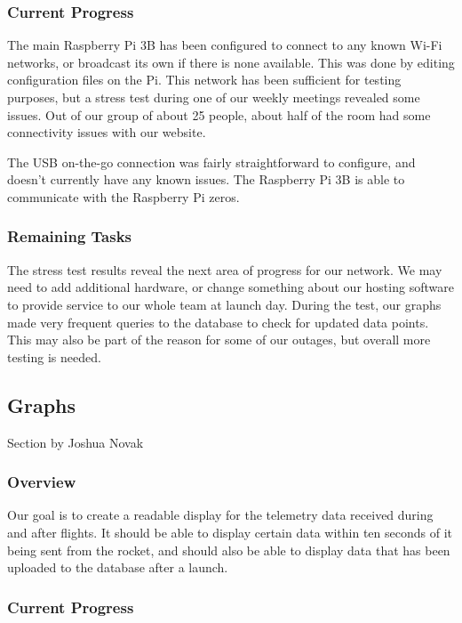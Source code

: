 \documentclass[onecolumn, draftclsnofoot, 10pt, compsoc]{IEEEtran}
\begin{document}
\subsubsection{Current Progress}
The main Raspberry Pi 3B has been configured to connect to any known Wi-Fi networks, or broadcast its own if there is none available. 
This was done by editing configuration files on the Pi. This network has been sufficient for testing purposes, but a stress test during one of our weekly meetings revealed some issues. 
Out of our group of about 25 people, about half of the room had some connectivity issues with our website. 

The USB on-the-go connection was fairly straightforward to configure, and doesn’t currently have any known issues.
The Raspberry Pi 3B is able to communicate with the Raspberry Pi zeros.


\subsubsection{Remaining Tasks}
The stress test results reveal the next area of progress for our network. 
We may need to add additional hardware, or change something about our hosting software to provide service to our whole team at launch day. 
During the test, our graphs made very frequent queries to the database to check for updated data points.
This may also be part of the reason for some of our outages, but overall more testing is needed.


\subsection{Graphs}
Section by Joshua Novak
\subsubsection{Overview}

Our goal is to create a readable display for the telemetry data received during and after flights. It should be able to display certain data within ten seconds of it being sent from the rocket, and should also be able to display data that has been uploaded to the database after a launch.
\subsubsection{Current Progress}
\end{document}
